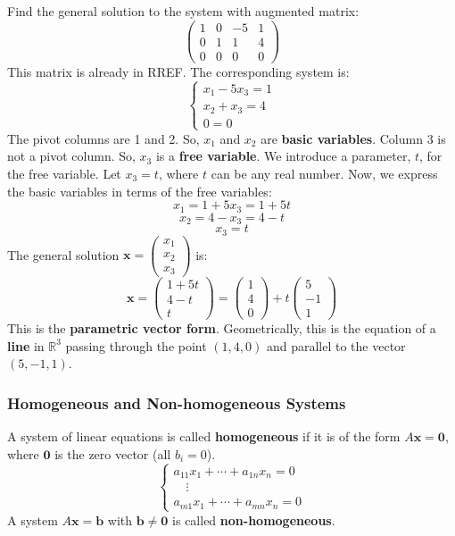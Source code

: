 \documentclass[oneside]{book}
\begin{document}
\begin{example}
Find the general solution to the system with augmented matrix:
\[
\left(\begin{array}{ccc|c}
1 & 0 & -5 & 1 \\
0 & 1 & 1 & 4 \\
0 & 0 & 0 & 0
\end{array}\right)
\]
This matrix is already in RREF. The corresponding system is:
\[
\begin{cases}
x_1 - 5x_3 = 1 \\
x_2 + x_3 = 4 \\
0 = 0
\end{cases}
\]
The pivot columns are 1 and 2. So, $x_1$ and $x_2$ are \textbf{basic variables}.
Column 3 is not a pivot column. So, $x_3$ is a \textbf{free variable}.
We introduce a parameter, $t$, for the free variable. Let $x_3 = t$, where $t$ can be any real number.
Now, we express the basic variables in terms of the free variables:
\[ x_1 = 1 + 5x_3 = 1 + 5t \]
\[ x_2 = 4 - x_3 = 4 - t \]
\[ x_3 = t \]
The general solution $\mathbf{x} = \begin{pmatrix} x_1 \\ x_2 \\ x_3 \end{pmatrix}$ is:
\[ \mathbf{x} = \begin{pmatrix} 1 + 5t \\ 4 - t \\ t \end{pmatrix} = \begin{pmatrix} 1 \\ 4 \\ 0 \end{pmatrix} + t \begin{pmatrix} 5 \\ -1 \\ 1 \end{pmatrix} \]
This is the \textbf{parametric vector form}.
Geometrically, this is the equation of a \textbf{line} in $\mathbb{R}^3$ passing through the point $(1, 4, 0)$ and parallel to the vector $(5, -1, 1)$.
\end{example}

\subsubsection{Homogeneous and Non-homogeneous Systems}

\begin{definition}
A system of linear equations is called \textbf{homogeneous} if it is of the form $A\mathbf{x} = \mathbf{0}$, where $\mathbf{0}$ is the zero vector (all $b_i = 0$).
\[
\begin{cases}
a_{11}x_1 + \cdots + a_{1n}x_n = 0\\
\quad \vdots \\
a_{m1}x_1 + \cdots + a_{mn}x_n = 0
\end{cases}
\]
A system $A\mathbf{x} = \mathbf{b}$ with $\mathbf{b} \neq \mathbf{0}$ is called \textbf{non-homogeneous}.
\end{definition}
\end{document}
